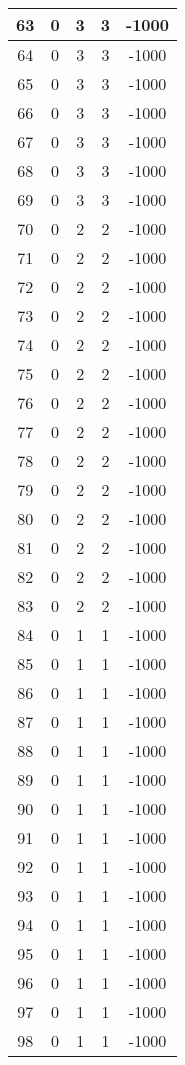 \documentclass[letterpaper, 12pt]{article}
\begin{document}
\begin{longtable}{|c|c|c|c|c|}
\hline
63 & 0 & 3 & 3 & -1000 \\
\hline
64 & 0 & 3 & 3 & -1000 \\
\hline
65 & 0 & 3 & 3 & -1000 \\
\hline
66 & 0 & 3 & 3 & -1000 \\
\hline
67 & 0 & 3 & 3 & -1000 \\
\hline
68 & 0 & 3 & 3 & -1000 \\
\hline
69 & 0 & 3 & 3 & -1000 \\
\hline
70 & 0 & 2 & 2 & -1000 \\
\hline
71 & 0 & 2 & 2 & -1000 \\
\hline
72 & 0 & 2 & 2 & -1000 \\
\hline
73 & 0 & 2 & 2 & -1000 \\
\hline
74 & 0 & 2 & 2 & -1000 \\
\hline
75 & 0 & 2 & 2 & -1000 \\
\hline
76 & 0 & 2 & 2 & -1000 \\
\hline
77 & 0 & 2 & 2 & -1000 \\
\hline
78 & 0 & 2 & 2 & -1000 \\
\hline
79 & 0 & 2 & 2 & -1000 \\
\hline
80 & 0 & 2 & 2 & -1000 \\
\hline
81 & 0 & 2 & 2 & -1000 \\
\hline
82 & 0 & 2 & 2 & -1000 \\
\hline
83 & 0 & 2 & 2 & -1000 \\
\hline
84 & 0 & 1 & 1 & -1000 \\
\hline
85 & 0 & 1 & 1 & -1000 \\
\hline
86 & 0 & 1 & 1 & -1000 \\
\hline
87 & 0 & 1 & 1 & -1000 \\
\hline
88 & 0 & 1 & 1 & -1000 \\
\hline
89 & 0 & 1 & 1 & -1000 \\
\hline
90 & 0 & 1 & 1 & -1000 \\
\hline
91 & 0 & 1 & 1 & -1000 \\
\hline
92 & 0 & 1 & 1 & -1000 \\
\hline
93 & 0 & 1 & 1 & -1000 \\
\hline
94 & 0 & 1 & 1 & -1000 \\
\hline
95 & 0 & 1 & 1 & -1000 \\
\hline
96 & 0 & 1 & 1 & -1000 \\
\hline
97 & 0 & 1 & 1 & -1000 \\
\hline
98 & 0 & 1 & 1 & -1000 \\

\end{longtable}
\end{document}
